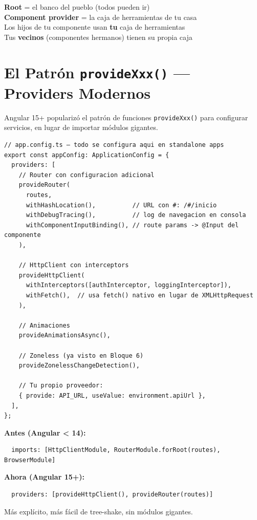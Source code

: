 \documentclass[12pt, a4paper]{article}
\begin{document}
\begin{tcolorbox}[analogia, title={\emoji{family} \emoji{house} La Casa Familiar}]
   \textbf{Root} = el banco del pueblo (todos pueden ir)\\
   \textbf{Component provider} = la caja de herramientas de tu casa\\
   Los hijos de tu componente usan \textbf{tu} caja de herramientas\\
   Tus \textbf{vecinos} (componentes hermanos) tienen su propia caja
\end{tcolorbox}

\section{  El Patrón \texttt{provideXxx()} --- Providers Modernos}

Angular 15+ popularizó el patrón de funciones \texttt{provideXxx()} para configurar servicios,
en lugar de importar módulos gigantes.

\begin{lstlisting}
// app.config.ts — todo se configura aqui en standalone apps
export const appConfig: ApplicationConfig = {
  providers: [
    // Router con configuracion adicional
    provideRouter(
      routes,
      withHashLocation(),          // URL con #: /#/inicio
      withDebugTracing(),          // log de navegacion en consola
      withComponentInputBinding(), // route params -> @Input del componente
    ),

    // HttpClient con interceptors
    provideHttpClient(
      withInterceptors([authInterceptor, loggingInterceptor]),
      withFetch(),  // usa fetch() nativo en lugar de XMLHttpRequest
    ),

    // Animaciones
    provideAnimationsAsync(),

    // Zoneless (ya visto en Bloque 6)
    provideZonelessChangeDetection(),

    // Tu propio proveedor:
    { provide: API_URL, useValue: environment.apiUrl },
  ],
};
\end{lstlisting}

\begin{tcolorbox}[importante, title={\emoji{old-key} \emoji{prohibited} La Era de los NgModules Terminó}]
  \textbf{Antes (Angular < 14):}
  \begin{lstlisting}
  imports: [HttpClientModule, RouterModule.forRoot(routes), BrowserModule]
  \end{lstlisting}
  \textbf{Ahora (Angular 15+):}
  \begin{lstlisting}
  providers: [provideHttpClient(), provideRouter(routes)]
  \end{lstlisting}
  Más explícito, más fácil de tree-shake, sin módulos gigantes.
\end{tcolorbox}
\end{document}
